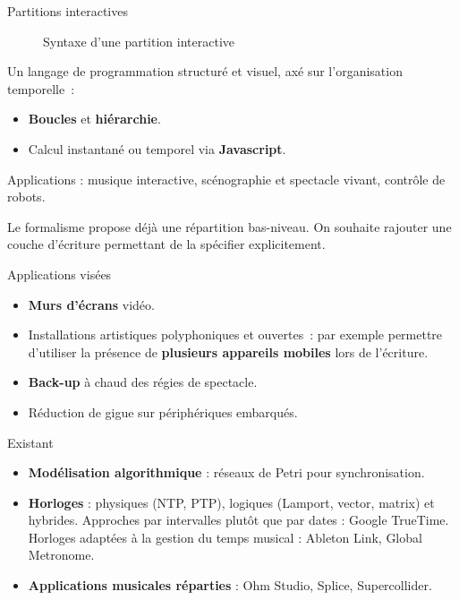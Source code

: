 \begin{block}{Partitions interactives}
\begin{figure}
\caption{Syntaxe d'une partition interactive}
\end{figure}
Un langage de programmation structuré et visuel, axé sur l'organisation temporelle~: 
\begin{itemize}
    \item \textbf{Boucles} et \textbf{hiérarchie}.
    \item Calcul instantané ou temporel via \textbf{Javascript}.
\end{itemize}

Applications : musique interactive, scénographie et spectacle vivant, contrôle de robots.

Le formalisme propose déjà une répartition bas-niveau.
On souhaite rajouter une couche d'écriture permettant de la spécifier explicitement.
\end{block}

\begin{block}{Applications visées}
    \begin{itemize}
        \item \textbf{Murs d'écrans} vidéo.
        \item Installations artistiques polyphoniques et ouvertes~: 
        par exemple permettre d'utiliser la présence de \textbf{plusieurs appareils mobiles} 
        lors de l'écriture.
        \item \textbf{Back-up} à chaud des régies de spectacle.
        \item Réduction de gigue sur périphériques embarqués.
    \end{itemize}
\end{block}

\begin{block}{Existant}
\begin{itemize}
    \item \textbf{Modélisation algorithmique} : réseaux de Petri pour synchronisation. 
    \item \textbf{Horloges} : physiques (NTP\cite{mills1991internet}, PTP\cite{peng2009research}), logiques (Lamport\cite{lamport1978time}, vector, matrix) et hybrides\cite{kulkarni2014logical}.
    Approches par intervalles plutôt que par dates : Google TrueTime.
    Horloges adaptées à la gestion du temps musical : Ableton Link, Global Metronome\cite{oda2016global}.
    \item 
    \textbf{Applications musicales réparties} : Ohm Studio, Splice, Supercollider\cite{carot2007networked}.
\end{itemize}
\end{block}